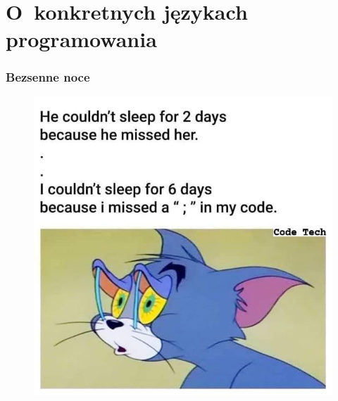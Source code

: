 \documentclass[10pt,t]{beamer}
\begin{document}
\section{O~konkretnych językach programowania}



\begin{frame}
  \frametitle{Bezsenne noce}


  \begin{figure}

    \centering


    \includegraphics[scale=0.28]
    {./PresentationsPictures/Lost-semicolon.jpg}

  \end{figure}

\end{frame}
\end{document}
